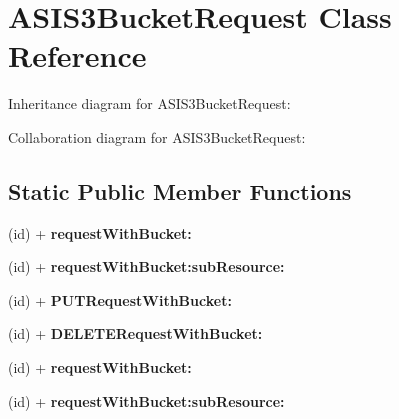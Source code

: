 \hypertarget{interface_a_s_i_s3_bucket_request}{
\section{\-A\-S\-I\-S3\-Bucket\-Request \-Class \-Reference}
\label{interface_a_s_i_s3_bucket_request}
}


\-Inheritance diagram for \-A\-S\-I\-S3\-Bucket\-Request\-:


\-Collaboration diagram for \-A\-S\-I\-S3\-Bucket\-Request\-:
\subsection*{\-Static \-Public \-Member \-Functions}
\begin{DoxyCompactItemize}
\item 
\hypertarget{interface_a_s_i_s3_bucket_request_a6e3d4e3d797528feefabae19ad1339a7}{
(id) + {\bfseries request\-With\-Bucket\-:}}
\label{interface_a_s_i_s3_bucket_request_a6e3d4e3d797528feefabae19ad1339a7}

\item 
\hypertarget{interface_a_s_i_s3_bucket_request_a99d01cefc0111bd8e6809ef9089c17c8}{
(id) + {\bfseries request\-With\-Bucket\-:sub\-Resource\-:}}
\label{interface_a_s_i_s3_bucket_request_a99d01cefc0111bd8e6809ef9089c17c8}

\item 
\hypertarget{interface_a_s_i_s3_bucket_request_a6a189c387a3e85f2b137332b00a756e4}{
(id) + {\bfseries \-P\-U\-T\-Request\-With\-Bucket\-:}}
\label{interface_a_s_i_s3_bucket_request_a6a189c387a3e85f2b137332b00a756e4}

\item 
\hypertarget{interface_a_s_i_s3_bucket_request_ab3c36a031e5391283c171e04ce8f640b}{
(id) + {\bfseries \-D\-E\-L\-E\-T\-E\-Request\-With\-Bucket\-:}}
\label{interface_a_s_i_s3_bucket_request_ab3c36a031e5391283c171e04ce8f640b}

\item 
\hypertarget{interface_a_s_i_s3_bucket_request_a6e3d4e3d797528feefabae19ad1339a7}{
(id) + {\bfseries request\-With\-Bucket\-:}}
\label{interface_a_s_i_s3_bucket_request_a6e3d4e3d797528feefabae19ad1339a7}

\item 
\hypertarget{interface_a_s_i_s3_bucket_request_a99d01cefc0111bd8e6809ef9089c17c8}{
(id) + {\bfseries request\-With\-Bucket\-:sub\-Resource\-:}}
\label{interface_a_s_i_s3_bucket_request_a99d01cefc0111bd8e6809ef9089c17c8}


\end{DoxyCompactItemize}
